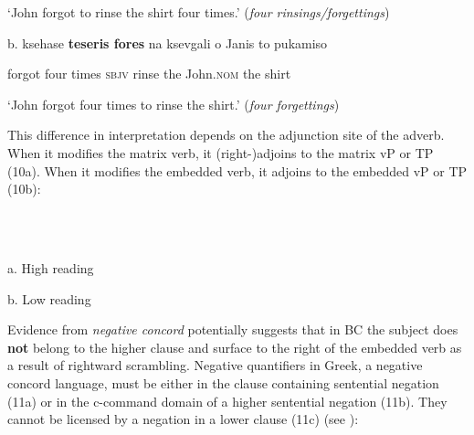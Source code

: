 \documentclass[output=paper]{langsci/langscibook}
\begin{document}
\begin{styleNurTexti}
    ‘John forgot to rinse the shirt four times.’ (\textit{four rinsings/forgettings})
\end{styleNurTexti}

\begin{styleNurTexti}
  b.  ksehase  \textbf{teseris  fores} na  ksevgali  o    Janis      to  pukamiso 
\end{styleNurTexti}

\begin{styleNurTexti}
    forgot  four   times  \textsc{sbjv}  rinse  the  John.\textsc{nom} the  shirt
\end{styleNurTexti}

\begin{styleNurTexti}
    ‘John forgot four times to rinse the shirt.’ (\textit{four forgettings})
\end{styleNurTexti}

\begin{styleTextkrperxxi}
This difference in interpretation depends on the adjunction site of the adverb. When it modifies the matrix verb, it (right-)adjoins to the matrix vP or TP (10a). When it modifies the embedded verb, it adjoins to the embedded vP or TP (10b):
\end{styleTextkrperxxi}

\ea%
    \label{ex:key:10}
    \gll\\
        \\
    \glt
    \z

          a.  High reading

 

b.  Low reading

 
\begin{styleTextkrperxxi}
Evidence from \textit{negative concord} potentially suggests that in BC the subject does \textbf{not} belong to the higher clause and surface to the right of the embedded verb as a result of rightward scrambling. Negative quantifiers in Greek, a negative concord language, must be either in the clause containing sentential negation (11a) or in the c-command domain of a higher sentential negation (11b). They cannot be licensed by a negation in a lower clause (11c) (see \citealt{Giannakidou1997}):
\end{styleTextkrperxxi}
\end{document}
